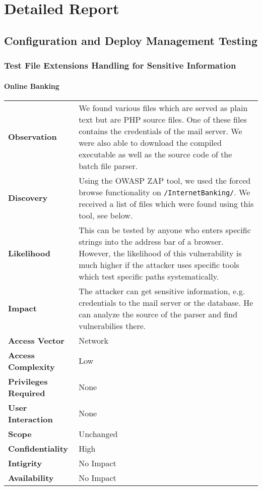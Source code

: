 \chapter{Detailed Report}\label{chapter:details}

\section{Configuration and Deploy Management Testing}

\subsection{Test File Extensions Handling for Sensitive Information}

\subsubsection*{Online Banking}

\begin{tabular}{l|p{10cm}}

\textbf{Observation} & We found various files which are served as plain text but are PHP source files. One of these files contains the credentials of the mail server. We were also able to download the compiled executable as well as the source code of the batch file parser. \\
\textbf{Discovery} & Using the OWASP ZAP tool, we used the forced browse functionality on \texttt{/InternetBanking/}. We received a list of files which were found using this tool, see below. \\
\textbf{Likelihood} & This can be tested by anyone who enters specific strings into the address bar of a browser. However, the likelihood of this vulnerability is much higher if the attacker uses specific tools which test specific paths systematically. \\
\textbf{Impact} & The attacker can get sensitive information, e.g. credentials to the mail server or the database. He can analyze the source of the parser and find vulnerabilies there. \\
\textbf{Access Vector} & Network \\
\textbf{Access Complexity} & Low \\
\textbf{Privileges Required} & None \\
\textbf{User Interaction} & None \\
\textbf{Scope} & Unchanged \\
\textbf{Confidentiality} & High \\
\textbf{Intigrity} & No Impact \\
\textbf{Availability} & No Impact \\
\end{tabular}

